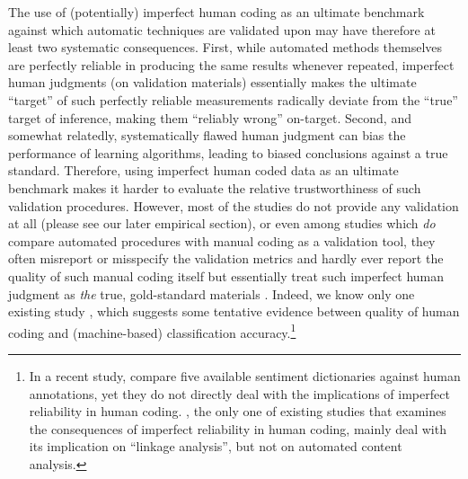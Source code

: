 \documentclass[man, 12pt, a4paper, nolmodern, noextraspace]{apa6}
\begin{document}
    The use of (potentially) imperfect human coding as an ultimate benchmark against which automatic techniques are validated upon may have therefore at least two systematic consequences. First, while automated methods themselves are perfectly reliable in producing the same results whenever repeated, imperfect human judgments (on validation materials) essentially makes the ultimate \enquote{target} of such perfectly reliable measurements radically deviate from the \enquote{true} target of inference, making them \enquote{reliably wrong} on-target. Second, and somewhat relatedly, systematically flawed human judgment can bias the performance of learning algorithms, leading to biased conclusions against a true standard. Therefore, using imperfect human coded data as an ultimate benchmark makes it harder to evaluate the relative trustworthiness of such validation procedures. However, most of the studies do not provide any validation at all (please see our later empirical section), or even among studies which \textit{do} compare automated procedures with manual coding as a validation tool, they often misreport or misspecify the validation metrics and hardly ever report the quality of such manual coding itself but essentially treat such imperfect human judgment as \textit{the} true, gold-standard materials \parencites[e.g.,][]{gonzalez2015signals, lowe2013validating, YoungSoroka2012}. Indeed, we know only one existing study \parencite{burscher2014teaching}, which suggests some tentative evidence between quality of human coding and (machine-based) classification accuracy.\footnote{In a recent study, \textcite{gonzalez2015signals} compare five available sentiment dictionaries against human annotations, yet they do not directly deal with the implications of imperfect reliability in human coding. \textcite{scharkow2017measurement}, the only one of existing studies that examines the consequences of imperfect reliability in human coding, mainly deal with its implication on \enquote{linkage analysis}, but not on automated content analysis.}     
   
\end{document}
